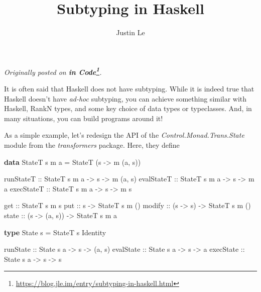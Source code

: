 \documentclass[]{article}
\title{Subtyping in Haskell}
\author{Justin Le}
\newenvironment{Shaded}{}{}
\newcommand{\DataTypeTok}[1]{\textcolor[rgb]{0.56,0.13,0.00}{#1}}
\newcommand{\FunctionTok}[1]{\textcolor[rgb]{0.02,0.16,0.49}{#1}}
\newcommand{\KeywordTok}[1]{\textcolor[rgb]{0.00,0.44,0.13}{\textbf{#1}}}
\newcommand{\NormalTok}[1]{#1}
\newcommand{\OtherTok}[1]{\textcolor[rgb]{0.00,0.44,0.13}{#1}}
\renewcommand{\href}[2]{#2\footnote{\url{#1}}}
\begin{document}
\maketitle

\emph{Originally posted on
\textbf{\href{https://blog.jle.im/entry/subtyping-in-haskell.html}{in Code}}.}

It is often said that Haskell does not have subtyping. While it is indeed true
that Haskell doesn't have \emph{ad-hoc} subtyping, you can achieve something
similar with Haskell, RankN types, and some key choice of data types or
typeclasses. And, in many situations, you can build programs around it!

As a simple example, let's redesign the API of the
\emph{Control.Monad.Trans.State} module from the \emph{transformers} package.
Here, they define

\begin{Shaded}
\begin{Highlighting}[]
\KeywordTok{data} \DataTypeTok{StateT}\NormalTok{ s m a }\FunctionTok{=} \DataTypeTok{StateT}\NormalTok{ (s }\OtherTok{->}\NormalTok{ m (a, s))}

\OtherTok{runStateT  ::} \DataTypeTok{StateT}\NormalTok{ s m a }\OtherTok{->}\NormalTok{ s }\OtherTok{->}\NormalTok{ m (a, s)}
\OtherTok{evalStateT ::} \DataTypeTok{StateT}\NormalTok{ s m a }\OtherTok{->}\NormalTok{ s }\OtherTok{->}\NormalTok{ m a}
\OtherTok{execStateT ::} \DataTypeTok{StateT}\NormalTok{ s m a }\OtherTok{->}\NormalTok{ s }\OtherTok{->}\NormalTok{ m s}

\OtherTok{get    ::}                  \DataTypeTok{StateT}\NormalTok{ s m s}
\OtherTok{put    ::}\NormalTok{ s             }\OtherTok{->} \DataTypeTok{StateT}\NormalTok{ s m ()}
\OtherTok{modify ::}\NormalTok{ (s }\OtherTok{->}\NormalTok{ s)      }\OtherTok{->} \DataTypeTok{StateT}\NormalTok{ s m ()}
\OtherTok{state  ::}\NormalTok{ (s }\OtherTok{->}\NormalTok{ (a, s)) }\OtherTok{->} \DataTypeTok{StateT}\NormalTok{ s m a}

\KeywordTok{type} \DataTypeTok{State}\NormalTok{ s }\FunctionTok{=} \DataTypeTok{StateT}\NormalTok{ s }\DataTypeTok{Identity}

\OtherTok{runState  ::} \DataTypeTok{State}\NormalTok{ s a  }\OtherTok{->}\NormalTok{ s }\OtherTok{->}\NormalTok{ (a, s)}
\OtherTok{evalState ::} \DataTypeTok{State}\NormalTok{ s a }\OtherTok{->}\NormalTok{ s }\OtherTok{->}\NormalTok{ a}
\OtherTok{execState ::} \DataTypeTok{State}\NormalTok{ s a }\OtherTok{->}\NormalTok{ s }\OtherTok{->}\NormalTok{ s}
\end{Highlighting}
\end{Shaded}
\end{document}
